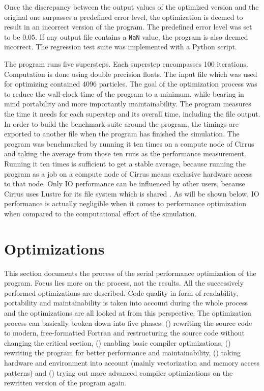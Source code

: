 \documentclass[twoside,11pt]{article}
\begin{document}
Once the discrepancy between the output values of the optimized
version and the original one surpasses a predefined error level,
the optimization is deemed to result in an incorrect version of the
program.
The predefined error level was set to be $0.05$.
If any output file contains a \texttt{NaN} value, the program is
also deemed incorrect.
The regression test suite was implemented with a Python script.

The program runs five supersteps.
Each superstep encompasses 100 iterations.
Computation is done using double precision floats.
The input file which was used for optimizing contained 4096 particles.
The goal of the optimization process was to reduce the wall-clock
time of the program to a minimum, while bearing in mind portability
and more importantly maintainability.
The program measures the time it needs for each superstep and its
overall time, including the file output.
In order to build the benchmark suite around the program, the timings
are exported to another file when the program has finished the
simulation.
The program was benchmarked by running it ten times on a compute node
of Cirrus and taking the average from those ten runs as the
performance measurement.
Running it ten times is sufficient to get a stable average,
because running the program as a job on a compute node of Cirrus
means exclusive hardware access to that node.
Only IO performance can be influenced by other users, because Cirrus
uses Lustre for its file system which is shared
\citep{cirrus_hardware}.
As will be shown below, IO performance is actually negligible when
it comes to performance optimization when compared to the
computational effort of the simulation.


\section{Optimizations} %
\label{sec:opt}

This section documents the process of the serial performance
optimization of the program.
Focus lies more on the process, not the results.
All the successively performed optimizations are described.
Code quality in form of readability, portability and maintainability
is taken into account during the whole process and the optimizations
are all looked at from this perspective.
The optimization process can basically broken down into five phases:
() rewriting the source code to modern, free-formatted
Fortran and restructuring the source code without changing the
critical section, () enabling basic compiler
optimizations, () rewriting the program for better
performance and maintainability, () taking hardware and
environment into account (mainly vectorization and memory access
patterns) and () trying out more advanced compiler
optimizations on the rewritten version of the program again.
\end{document}
